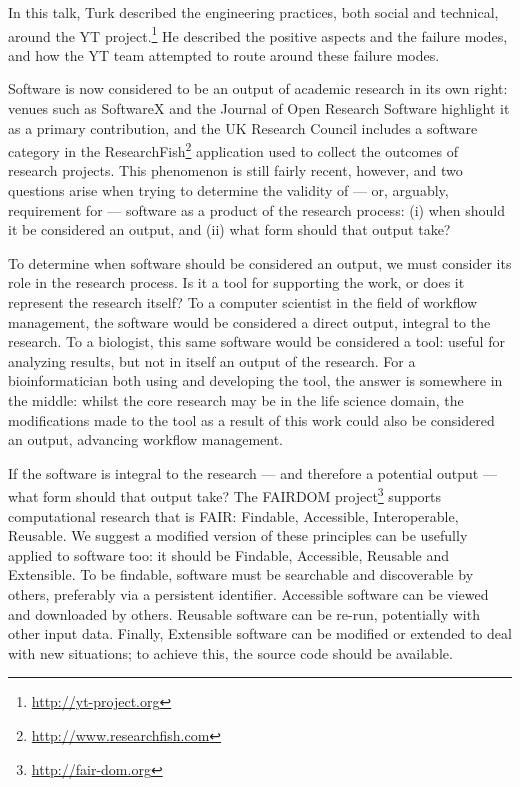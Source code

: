 \documentclass[a4paper,UKenglish]{dagrep}
\begin{document}

In this talk, Turk described the engineering practices, both social and
technical, around the YT project.\footnote{\url{http://yt-project.org}}
He described the positive aspects and the failure modes, and how the YT team attempted to
route around these failure modes.


Software is now considered to be an output of academic research in its own right: venues such as SoftwareX and the Journal of Open Research Software highlight it as a primary contribution, and the UK Research Council includes a software category in the ResearchFish\footnote{\url{http://www.researchfish.com}} application used to collect the outcomes of research projects. This phenomenon is still fairly recent, however, and two questions arise when trying to determine the validity of --- or, arguably, requirement for --- software as a product of the research process: (i) when should it be considered an output, and (ii) what form should that output take?

To determine when software should be considered an output, we must consider its role in the research process. Is it a tool for supporting the work, or does it represent the research itself? To a computer scientist in the field of workflow management, the software would be considered a direct output, integral to the research. To a biologist, this same software would be considered a tool: useful for analyzing results, but not in itself an output of the research. For a bioinformatician both using and developing the tool, the answer is somewhere in the middle: whilst the core research may be in the life science domain, the modifications made to the tool as a result of this work could also be considered an output, advancing workflow management.

If the software is integral to the research --- and therefore a potential output --- what form should that output take? The FAIRDOM project\footnote{\url{http://fair-dom.org}} supports computational research that is FAIR: Findable, Accessible, Interoperable, Reusable. We suggest a modified version of these principles can be usefully applied to software too: it should be Findable, Accessible, Reusable and Extensible. To be findable, software must be searchable and discoverable by others, preferably via a persistent identifier. Accessible software can be viewed and downloaded by others. Reusable software can be re-run, potentially with other input data. Finally, Extensible software can be modified or extended to deal with new situations; to achieve this, the source code should be available.
\end{document}
